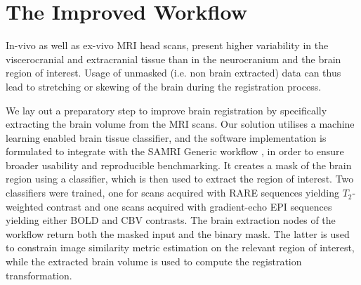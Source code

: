 \section{The Improved Workflow}

In-vivo as well as ex-vivo MRI head scans, present higher variability in the viscerocranial and extracranial tissue than in the neurocranium and the brain region of interest.
Usage of unmasked (i.e. non brain extracted) data can thus lead to stretching or skewing of the brain during the registration process.

We lay out a preparatory step to improve brain registration by specifically extracting the brain volume from the MRI scans.
Our solution utilises a machine learning enabled brain tissue classifier, and the software implementation is formulated to integrate with the SAMRI Generic workflow \cite{ioanas_optimized_2019}, in order to ensure broader usability and reproducible benchmarking.
It creates a mask of the brain region using a classifier, which is then used to extract the region of interest.
Two classifiers were trained, one for scans acquired with RARE sequences yielding $T_2$-weighted contrast and one scans acquired with gradient-echo EPI sequences yielding either BOLD \cite{bold} and CBV \cite{cbv} contrasts.
The brain extraction nodes of the workflow return both the masked input and the binary mask.
The latter is used to constrain image similarity metric estimation on the relevant region of interest, while the extracted brain volume is used to compute the registration transformation.

